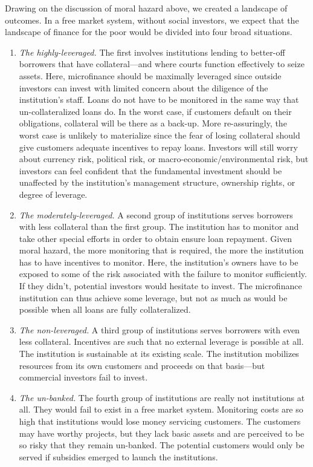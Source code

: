 \documentclass[letterpaper, 12pt]{article}
\begin{document}
Drawing on the discussion of moral hazard above, we created a landscape
of outcomes. In a free market system, without social investors, we
expect that the landscape of finance for the poor would be divided into
four broad situations.
\begin{enumerate}
\item \emph{The highly-leveraged.} The first involves institutions lending
to better-off borrowers that have collateral---and where courts function
effectively to seize assets. Here, microfinance should be maximally
leveraged since outside investors can invest with limited concern about
the diligence of the institution's staff. Loans do not have to be
monitored in the same way that un-collateralized loans do. In the worst
case, if customers default on their obligations, collateral will be
there as a back-up. More re-assuringly, the worst case is unlikely to
materialize since the fear of losing collateral should give customers
adequate incentives to repay loans. Investors will still worry about
currency risk, political risk, or macro-economic/environmental risk, but
investors can feel confident that the fundamental investment should be
unaffected by the institution's management structure, ownership rights,
or degree of leverage.

\item  \emph{The moderately-leveraged.} A second group of institutions
serves borrowers with less collateral than the first group. The
institution has to monitor and take other special efforts in order to
obtain ensure loan repayment. Given moral hazard, the more monitoring
that is required, the more the institution has to have incentives to
monitor. Here, the institution's owners have to be exposed to some of
the risk associated with the failure to monitor sufficiently. If they
didn't, potential investors would hesitate to invest. The microfinance
institution can thus achieve some leverage, but not as much as would be
possible when all loans are fully collateralized.

\item \emph{The non-leveraged.} A third group of institutions serves
borrowers with even less collateral. Incentives are such that no
external leverage is possible at all. The institution is sustainable at
its existing scale. The institution mobilizes resources from its own
customers and proceeds on that basis---but commercial investors fail to
invest.

\item  \emph{The un-banked.} The fourth group of institutions are really
not institutions at all. They would fail to exist in a free market
system. Monitoring costs are so high that institutions would lose money
servicing customers. The customers may have worthy projects, but they
lack basic assets and are perceived to be so risky that they remain
un-banked. The potential customers would only be served if subsidies
emerged to launch the institutions.
\end{enumerate}
\end{document}
